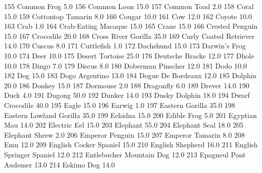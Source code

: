 \documentclass[a4paper]{article}
\begin{document}
\begin{Schunk}
\begin{Soutput}
155                    Common Frog      5.0
156                    Common Loon     15.0
157                    Common Toad      2.0
158                          Coral     15.0
159              Cottontop Tamarin      8.0
160                         Cougar     10.0
161                            Cow     12.0
162                         Coyote     10.0
163                           Crab      1.0
164            Crab-Eating Macaque     15.0
165                          Crane     15.0
166                Crested Penguin     15.0
167                      Crocodile     20.0
168            Cross River Gorilla     35.0
169         Curly Coated Retriever     14.0
170                         Cuscus      8.0
171                     Cuttlefish      1.0
172                      Dachshund     15.0
173                  Darwin's Frog     10.0
174                           Deer     10.0
175                Desert Tortoise     25.0
176                Deutsche Bracke     12.0
177                          Dhole     10.0
178                          Dingo      7.0
179                         Discus      8.0
180              Doberman Pinscher     12.0
181                           Dodo     10.0
182                            Dog     15.0
183                 Dogo Argentino     13.0
184              Dogue De Bordeaux     12.0
185                        Dolphin     20.0
186                         Donkey     15.0
187                       Dormouse      2.0
188                      Dragonfly      6.0
189                         Drever     14.0
190                           Duck      4.0
191                         Dugong     50.0
192                         Dunker     14.0
193                  Dusky Dolphin     18.0
194                Dwarf Crocodile     40.0
195                          Eagle     15.0
196                        Earwig       1.0
197                Eastern Gorilla     35.0
198        Eastern Lowland Gorilla     35.0
199                        Echidna     15.0
200                    Edible Frog      5.0
201                   Egyptian Mau     14.0
202                   Electric Eel     15.0
203                       Elephant     55.0
204                  Elephant Seal     18.0
205                 Elephant Shrew      2.0
206                Emperor Penguin     15.0
207                Emperor Tamarin      8.0
208                            Emu     12.0
209         English Cocker Spaniel     15.0
210               English Shepherd     16.0
211       English Springer Spaniel     12.0
212       Entlebucher Mountain Dog     12.0
213          Epagneul Pont Audemer     13.0
214                     Eskimo Dog     14.0

\end{Soutput}
\end{Schunk}
\end{document}
